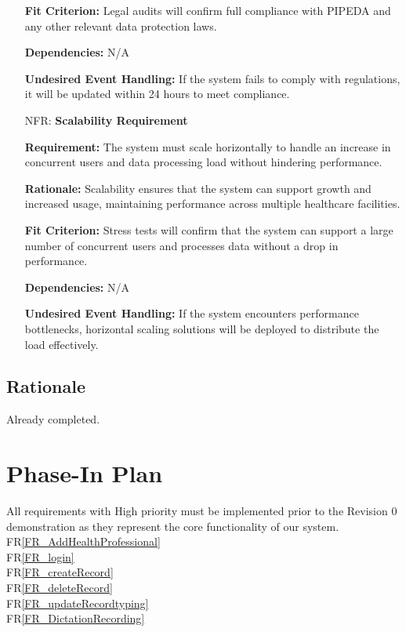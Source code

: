 \documentclass[12pt]{article}
\newcounter{nfrnum} %
\begin{document}
\begin{itemize}
    \textbf{Fit Criterion:} Legal audits will confirm full compliance with PIPEDA and any other relevant data protection laws.  

    \textbf{Dependencies:} N/A

    \textbf{Undesired Event Handling:} If the system fails to comply with regulations, it will be updated within 24 hours to meet compliance.

\item[NFR\refstepcounter{nfrnum}\thenfrnum \label{NFR_Scalability}:] \textbf{Scalability Requirement}

    \textbf{Requirement:} The system must scale horizontally to handle an increase in concurrent users and data processing load without hindering performance.

    \textbf{Rationale:} Scalability ensures that the system can support growth and increased usage, maintaining performance across multiple healthcare facilities.  

    \textbf{Fit Criterion:}  Stress tests will confirm that the system can support a large number of concurrent users and processes data without a drop in performance.  

    \textbf{Dependencies:} N/A

    \textbf{Undesired Event Handling:} If the system encounters performance bottlenecks, horizontal scaling solutions will be deployed to distribute the load effectively.

\end{itemize}

\subsection{Rationale}

Already completed.

\section{Phase-In Plan}

All requirements with High priority must be implemented prior to the Revision 0 demonstration as they represent the core functionality of our system.\\
FR\ref{FR_AddHealthProfessional}\\
FR\ref{FR_login}\\
FR\ref{FR_createRecord}\\
FR\ref{FR_deleteRecord}\\
FR\ref{FR_updateRecordtyping}\\ 
FR\ref{FR_DictationRecording}\\
\end{document}

